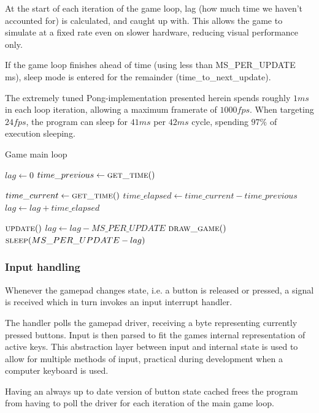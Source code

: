At the start of each iteration of the game loop, lag (how much time we haven't
accounted for) is calculated, and caught up with.
This allows the game to simulate at a fixed rate even on slower hardware,
reducing visual performance only.

If the game loop finishes ahead of time (using less than MS\_PER\_UPDATE ms),
sleep mode is entered for the remainder (time\_to\_next\_update).

The extremely tuned Pong-implementation presented herein spends roughly $ 1 ms $
in each loop iteration, allowing a maximum framerate of $ 1000 fps $.
When targeting $ 24 fps $, the program can sleep for $ 41 ms $ per $ 42 ms $ cycle,
spending $ 97 \% $ of execution sleeping.

\begin{algorithm}
  \caption{Game main loop}
  \begin{algorithmic}
    \State $lag \gets 0$
    \State $time\_previous \gets \Call{get\_time}{\null}$

    \Loop
      \State $time\_current \gets \Call{get\_time}{\null}$
      \State $time\_elapsed \gets time\_current - time\_previous$
      \State $lag \gets lag + time\_elapsed$

        \State $\Call{update}{\null}$
        \State $lag \gets lag - MS\_PER\_UPDATE$
      \EndWhile
      \State $\Call{draw\_game}{\null}$
      \State $\Call{sleep}{MS\_PER\_UPDATE - lag}$
    \EndLoop
  \end{algorithmic}
\end{algorithm}

\subsubsection{Input handling}
Whenever the gamepad changes state, i.e. a button is released or pressed,
a signal is received which in turn invokes an input interrupt handler.

The handler polls the gamepad driver, receiving a byte representing currently
pressed buttons. Input is then parsed to fit the games internal representation
of active keys. This abstraction layer between input and internal state is used
to allow for multiple methods of input, practical during development when a
computer keyboard is used.

Having an always up to date version of button state cached frees the program
from having to poll the driver for each iteration of the main game loop.

